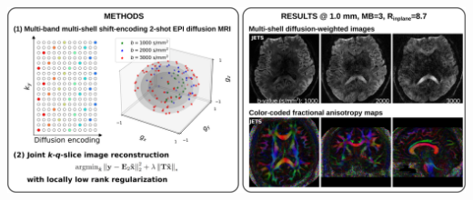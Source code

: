 \documentclass[preprint,12pt,authoryear,review]{elsarticle}
\begin{document}
\begin{frontmatter}
        \begin{abstract}
            The pursuit of high spatial-angular-temporal resolution
            for in vivo diffusion-weighted magnetic resonance imaging
            (DW-MRI) at ultra-high field strength (e.g., \SI{7}{\tesla})
            is important in understanding brain microstructure and function.
            Such pursuit, however, faces several technical challenges.
            First, increased off-resonance and shorter $T_2$ relaxation
            require faster echo train readouts.
            Second, high angular resolution in $q$-space requires
            the use of high and/or multiple $b$-values.
            \hl{High \mbox{$b$}-values supply strongly diffusion-weighted images,
            which have lower signal-to-noise ratio (SNR).} 
            Multi-shot interleaved echo-planar imaging (EPI) and
            advanced reconstruction strategies
            have been proven suitable for high-resolution DW-MRI.
            These methods, however, utilize fully-sampled EPI and thus
            require longer scan time compared to single-shot EPI.
            To address these challenges, 
            \hl{we developed the \mbox{$k_y$} shift encoding scheme
            among diffusion encodings
            to explore complementary \mbox{$k$}-\mbox{$q$}-space sampling.
            Moreover, we developed a novel joint reconstruction
            with locally low rank regularization}
            for multi-shell multi-band shift-encoding acquisition at \SI{7}{\tesla} (JETS-EPI).
            Our sampling method allows for faster acquisition
            with the use of high in-plane undersampling
            and only two shots per diffusion direction.
            The proposed joint reconstruction exhibits better denoising of DW images
            and clearer delineation of fiber distributions.
            \vspace{3em}
        \end{abstract}

        \begin{graphicalabstract}
            \includegraphics[width=\linewidth]{../figures/graph.png}
        \end{graphicalabstract}


\end{frontmatter}
\end{document}
